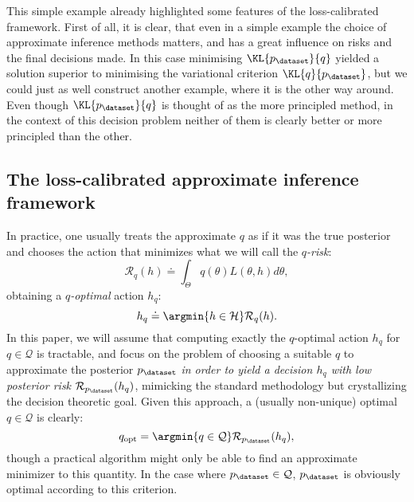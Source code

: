 This simple example already highlighted some features of the loss-calibrated framework. First of all, it is clear, that even in a simple example the choice of approximate inference methods matters, and has a great influence on risks and the final decisions made. In this case minimising $\KL{p_\dataset}{q}$ yielded a solution superior to minimising the variational criterion $\KL{q}{p_\dataset}$, but we could just as well construct another example, where it is the other way around. Even though $\KL{p_\dataset}{q}$ is thought of as the more principled method, in the context of this decision problem neither of them is clearly better or more principled than the other.

\subsection{The loss-calibrated approximate inference framework}

In practice, one usually treats the approximate $q$ as if it was the true posterior and chooses the action that minimizes what we will call the \emph{$q$-risk}:
\begin{equation} \label{e:q-risk}
    \mathcal{R}_q(h) \doteq \int_\Theta q(\theta) L(\theta,h) d\theta ,
\end{equation}
obtaining a \emph{$q$-optimal} action $h_q$:
\begin{equation}
    h_q \doteq \argmin{h \in \mathcal{H}} \mathcal{R}_q(h).
\end{equation}
In this paper, we will assume that computing exactly the $q$-optimal action $h_q$ for $q \in \mathcal{Q}$ is tractable, and focus on the problem of choosing a suitable $q$ to approximate the posterior $p_\dataset$ \emph{in order to yield a decision $h_q$ with low posterior risk $\mathcal{R}_{p_\dataset}(h_q)$}, mimicking the standard methodology but crystallizing the decision theoretic goal. Given this approach, a (usually non-unique) optimal $q \in \mathcal{Q}$ is clearly:
\begin{equation}
    q_\mathrm{opt} = \argmin{q \in \mathcal{Q}} \mathcal{R}_{p_\dataset}(h_q),
\end{equation}
though a practical algorithm might only be able to find an approximate minimizer to this quantity. In the case where $p_\dataset\in\mathcal{Q}$, $p_\dataset$ is obviously optimal according to this criterion.


